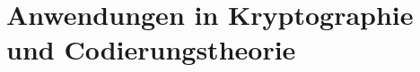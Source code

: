 %
%
%
\chapter{Anwendungen in Kryptographie und Codierungstheorie
\label{buch:chapter:kryptographie}}
\rhead{}




